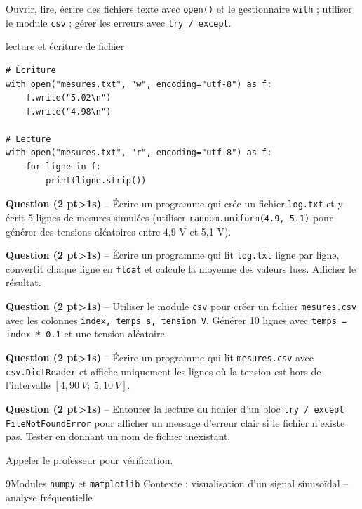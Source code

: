 \documentclass[11pt,a4paper]{article}
\newcommand{\cadreblanc}[1]{%
  \medskip\framebox[\linewidth][c]{\rule{0mm}{#1mm}}\par\medskip}
\newcounter{qnum}
\newcommand{\resetq}{\setcounter{qnum}{0}}
\newcommand{\q}[2]{%
  \stepcounter{qnum}%
  \noindent\textbf{Question \theqnum{} \normalfont(#2 pt\ifnum#2>1s\fi)} -- #1\par\smallskip}
\begin{document}
\begin{objectifbox}{}
  Ouvrir, lire, écrire des fichiers texte avec \texttt{open()} et le gestionnaire \texttt{with} ; utiliser le module \texttt{csv} ; gérer les erreurs avec \texttt{try / except}.
\end{objectifbox}

\begin{codebox}{lecture et écriture de fichier}
\begin{lstlisting}
# Écriture
with open("mesures.txt", "w", encoding="utf-8") as f:
    f.write("5.02\n")
    f.write("4.98\n")

# Lecture
with open("mesures.txt", "r", encoding="utf-8") as f:
    for ligne in f:
        print(ligne.strip())
\end{lstlisting}
\end{codebox}

\q{Écrire un programme qui crée un fichier \texttt{log.txt} et y écrit 5 lignes de mesures simulées (utiliser \texttt{random.uniform(4.9, 5.1)} pour générer des tensions aléatoires entre 4,9 V et 5,1 V).}{2}
\cadreblanc{24}

\q{Écrire un programme qui lit \texttt{log.txt} ligne par ligne, convertit chaque ligne en \texttt{float} et calcule la moyenne des valeurs lues. Afficher le résultat.}{2}
\cadreblanc{22}

\q{Utiliser le module \texttt{csv} pour créer un fichier \texttt{mesures.csv} avec les colonnes \texttt{index, temps\_s, tension\_V}. Générer 10 lignes avec \texttt{temps = index * 0.1} et une tension aléatoire.}{2}
\cadreblanc{26}

\q{Écrire un programme qui lit \texttt{mesures.csv} avec \texttt{csv.DictReader} et affiche uniquement les lignes où la tension est hors de l'intervalle $[4{,}90\ V ;\ 5{,}10\ V]$.}{2}
\cadreblanc{24}

\q{Entourer la lecture du fichier d'un bloc \texttt{try / except FileNotFoundError} pour afficher un message d'erreur clair si le fichier n'existe pas. Tester en donnant un nom de fichier inexistant.}{2}
\cadreblanc{22}

\begin{appelbox}
  \centering Appeler le professeur pour vérification.
\end{appelbox}

\clearpage
\resetq
\begin{tptitre}{9}{Modules \texttt{numpy} et \texttt{matplotlib}}
  Contexte : visualisation d'un signal sinusoïdal -- analyse fréquentielle
\end{tptitre}
\end{document}
